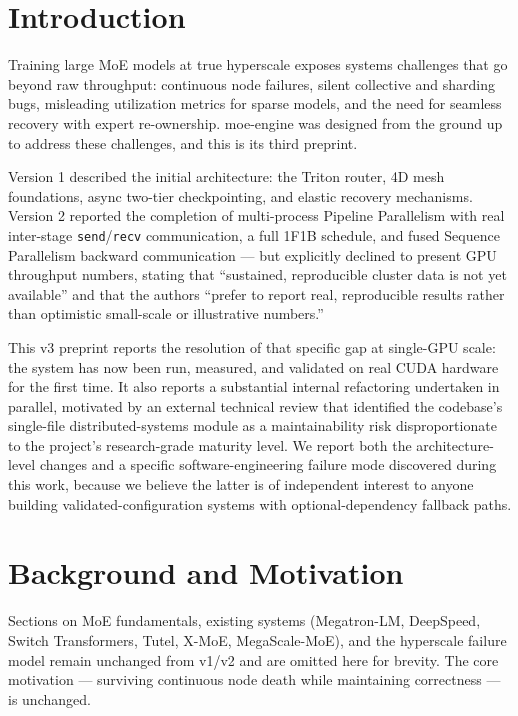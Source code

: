 \documentclass[11pt]{article}
\begin{document}
\section{Introduction}

Training large MoE models at true hyperscale exposes systems challenges
that go beyond raw throughput: continuous node failures, silent collective
and sharding bugs, misleading utilization metrics for sparse models, and
the need for seamless recovery with expert re-ownership. moe-engine was
designed from the ground up to address these challenges, and this is its
third preprint.

Version 1 described the initial architecture: the Triton router, 4D mesh
foundations, async two-tier checkpointing, and elastic recovery mechanisms.
Version 2 reported the completion of multi-process Pipeline Parallelism
with real inter-stage \texttt{send}/\texttt{recv} communication, a full
1F1B schedule, and fused Sequence Parallelism backward communication ---
but explicitly declined to present GPU throughput numbers, stating that
``sustained, reproducible cluster data is not yet available'' and that the
authors ``prefer to report real, reproducible results rather than
optimistic small-scale or illustrative numbers.''

This v3 preprint reports the resolution of that specific gap at single-GPU
scale: the system has now been run, measured, and validated on real CUDA
hardware for the first time. It also reports a substantial internal
refactoring undertaken in parallel, motivated by an external technical
review that identified the codebase's single-file distributed-systems
module as a maintainability risk disproportionate to the project's
research-grade maturity level. We report both the architecture-level
changes and a specific software-engineering failure mode discovered during
this work, because we believe the latter is of independent interest to
anyone building validated-configuration systems with optional-dependency
fallback paths.

\section{Background and Motivation}

Sections on MoE fundamentals, existing systems (Megatron-LM, DeepSpeed,
Switch Transformers, Tutel, X-MoE, MegaScale-MoE), and the hyperscale
failure model remain unchanged from v1/v2 and are omitted here for
brevity. The core motivation --- surviving continuous node death while
maintaining correctness --- is unchanged.
\end{document}
